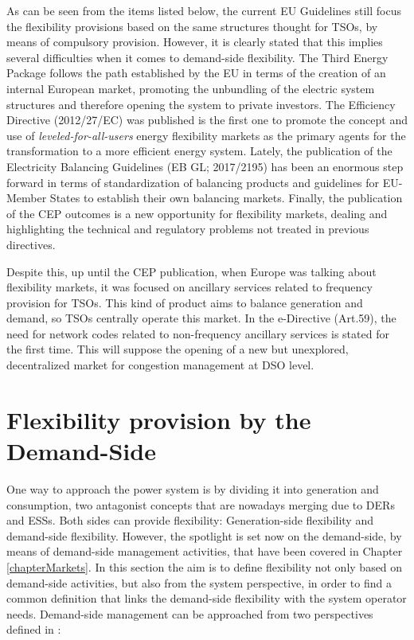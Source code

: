 \vspace{-5mm}

As can be seen from the items listed below, the current EU Guidelines still focus the flexibility provisions based on the same structures thought for TSOs, by means of compulsory provision. However, it is clearly stated that this implies several difficulties when it comes to demand-side flexibility.
The Third Energy Package follows the path established by the EU in terms of the creation of an internal European market, promoting the unbundling of the electric system structures and therefore opening the system to private investors. The Efficiency Directive (2012/27/EC) was published is the first one to promote the concept and use of \textit{leveled-for-all-users} energy flexibility markets as the primary agents for the transformation to a more efficient energy system. Lately, the publication of the Electricity Balancing Guidelines (EB GL; 2017/2195) has been an enormous step forward in terms of standardization of balancing products and guidelines for EU-Member States to establish their own balancing markets. Finally, the publication of the CEP \cite{validzic2017clean} outcomes is a new opportunity for flexibility markets, dealing and highlighting the technical and regulatory problems not treated in previous directives. 

Despite this, up until the CEP publication, when Europe was talking about flexibility markets, it was focused on ancillary services related to frequency provision for TSOs. This kind of product aims to balance generation and demand, so TSOs centrally operate this market. In the e-Directive (Art.59), the need for network codes related to non-frequency ancillary services is stated for the first time. This will suppose the opening of a new but unexplored, decentralized market for congestion management at DSO level.


\section{Flexibility provision by the Demand-Side} \label{sec:FlexibilityProvision}

One way to approach the power system is by dividing it into generation and consumption, two antagonist concepts that are nowadays merging due to DERs and ESSs. Both sides can provide flexibility: Generation-side flexibility and demand-side flexibility. However, the spotlight is set now on the demand-side, by means of demand-side management activities, that have been covered in Chapter \ref{chapterMarkets}. In this section the aim is to define flexibility not only based on demand-side activities, but also from the system perspective, in order to find a common definition that links the demand-side flexibility with the system operator needs. Demand-side management can be approached from two perspectives defined in \cite{USEF2018}:

